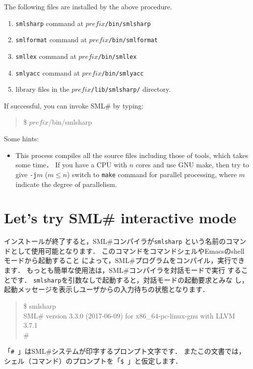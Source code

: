 \documentclass{jbook}
\newcommand{\txt}[2]{#2}
\newcommand{\smlsharp}{SML\#}
\newcommand{\version}{3.3.0}
\newcommand{\releaseDate}{2017-06-09}
\newenvironment{program}{\begin{quote}\begin{tt}}%
                        {\end{tt}\end{quote}}
\begin{document}
	The following files are installed by the above procedure.
\begin{enumerate}
\item {\tt smlsharp} command at {\tt $\mathit{prefix}$/bin/smlsharp}
\item {\tt smlformat} command at {\tt $\mathit{prefix}$/bin/smlformat}
\item {\tt smllex} command at {\tt $\mathit{prefix}$/bin/smllex}
\item {\tt smlyacc} command at {\tt $\mathit{prefix}$/bin/smlyacc}
\item library files in the {\tt $\mathit{prefix}$/lib/smlsharp/} directory.
\end{enumerate}
	If successful, you can invoke \smlsharp{} by typing:
\begin{program}
\$ $\mathit{prefix}$/bin/smlsharp
\end{program}

Some hints:
\begin{itemize}
\item 
	This process compiles all the source files including those of
tools, which takes some time．
	If you have a CPU with $n$ cores and use GNU make, then try to
give {\tt -j$m$} ($m \le n$) switch to {\tt make} command for
parallel processing, where $m$ indicate the degree of parallelism. 
\end{itemize}
\fi%

\section{
\txt{\smlsharp{}の対話型モードを使ってみよう}
    {Let's try \smlsharp{} interactive mode}}
\label{sec:tutorialInteractive}

\ifjp%

	インストールが終了すると，\smlsharp{}コンパイラが{\tt smlsharp}
という名前のコマンドとして使用可能となります．
	このコマンドをコマンドシェルやEmacsのshellモードから起動すること
によって，\smlsharp{}プログラムをコンパイル，実行できます．
	もっとも簡単な使用法は，\smlsharp{}コンパイラを対話モードで実行
することです．
	{\tt smlsharp}を引数なしで起動すると，対話モードの起動要求とみな
し，起動メッセージを表示しユーザからの入力待ちの状態となります．
\begin{tt}
\begin{quote}
\$ smlsharp\\
SML\# version \version{} (\releaseDate{}) for x86\_64-pc-linux-gnu with LLVM 3.7.1\\
\# 
\end{quote}
\end{tt}
	「{\tt \#\ }」は\smlsharp{}システムが印字するプロンプト文字です． 
	またこの文書では，シェル（コマンド）のプロンプトを「{\tt \$\ }」と仮定します．
\end{document}
